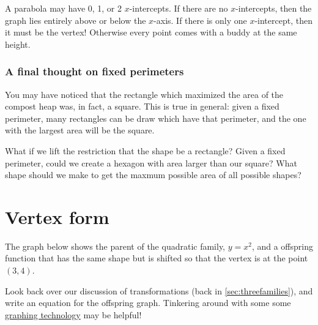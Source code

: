 A parabola may have 0, 1, or 2 $x$-intercepts. If there are no $x$-intercepts, then the graph lies entirely above or below the $x$-axis. If there is only one $x$-intercept, then it must be the vertex! Otherwise every point comes with a buddy at the same height.


\subsubsection{A final thought on fixed perimeters}

You may have noticed that the rectangle which maximized the area of the compost heap was, in fact, a square. This is true in general: given a fixed perimeter, many rectangles can be draw which have that perimeter, and the one with the largest area will be the square.

What if we lift the restriction that the shape be a rectangle? Given a fixed perimeter, could we create a hexagon with area larger than our square? What shape should we make to get the maxmum possible area of all possible shapes?


\section{Vertex form}
\label{sec:vertexform}

\begin{boxexplore}
The graph below shows the parent of the quadratic family, $y=x^2$, and a offspring function that has the same shape but is shifted so that the vertex is at the point $(3, 4)$.

\begin{center}
\end{center}

Look back over our discussion of transformations (back in \cref{sec:threefamilies}), and write an equation for the offspring graph. Tinkering around with some some \href{https://www.desmos.com/}{graphing technology} may be helpful!
\end{boxexplore}

